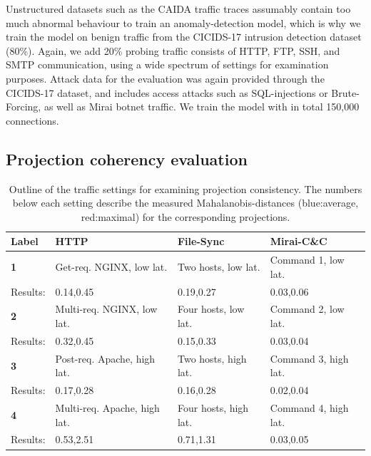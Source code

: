 \documentclass[conference]{IEEEtran}
\begin{document}
Unstructured datasets such as the CAIDA traffic traces assumably contain too much abnormal behaviour to train an anomaly-detection model, which is why we train the model on benign traffic from the CICIDS-17 \cite{sharafaldin2018toward} intrusion detection dataset (80\%). Again, we add 20\% probing traffic consists of HTTP, FTP, SSH, and SMTP communication, using a wide spectrum of settings for examination purposes. Attack data for the evaluation was again provided through the CICIDS-17 dataset, and includes access attacks such as SQL-injections or Brute-Forcing, as well as Mirai botnet traffic. We  train the model with in total 150,000 connections.

\subsection{Projection coherency evaluation}

\begin{table}
\centering
\begin{tabular}{p{0.8cm}|p{2.3cm}|p{1.5cm}|p{1.6cm}}
Label&\textbf{HTTP}&\textbf{File-Sync} & \textbf{Mirai-C\&C}\\ \hline 
\textbf{1}& Get-req. NGINX, low lat.&  Two hosts, low lat. & Command 1, low lat. \vspace{0.1cm} \\ \hline
Results:& \textcolor{myblue}{0.14}\space ,\space\space\textcolor{myred}{0.45} 
&\textcolor{myblue}{0.19}\space ,\space\space\textcolor{myred}{0.27} 
&\textcolor{myblue}{0.03}\space ,\space\space\textcolor{myred}{0.06}\\ \hline \hline
\textbf{2}&Multi-req. NGINX, low lat. & Four hosts, low lat. & Command 2, low lat.\\ \hline
Results:&\textcolor{myblue}{0.32}\space ,\space\space\textcolor{myred}{0.45} 
&\textcolor{myblue}{0.15}\space ,\space\space\textcolor{myred}{0.33} 
&\textcolor{myblue}{0.03}\space ,\space\space\textcolor{myred}{0.04}\\ \hline \hline
\textbf{3}& Post-req. Apache, high lat. &Two hosts, high lat. & Command 3, high lat.\\ \hline
Results:&\textcolor{myblue}{0.17}\space ,\space\space\textcolor{myred}{0.28} 
&\textcolor{myblue}{0.16}\space ,\space\space\textcolor{myred}{0.28} 
&\textcolor{myblue}{0.02}\space ,\space\space\textcolor{myred}{0.04}\\ \hline \hline
\textbf{4}& Multi-req. Apache, high lat. & Four hosts, high lat. & Command 4, high lat.\\ \hline
Results:&\textcolor{myblue}{0.53}\space ,\space\space\textcolor{myred}{2.51} 
&\textcolor{myblue}{0.71}\space ,\space\space\textcolor{myred}{1.31} 
&\textcolor{myblue}{0.03}\space ,\space\space\textcolor{myred}{0.05}\\ \hline \hline
\end{tabular}
\caption{Outline of the traffic settings for examining projection consistency. The numbers below each setting describe the measured Mahalanobis-distances (blue:average, red:maximal) for the corresponding projections.}\label{Tab:Dataset}
\end{table}
\end{document}
